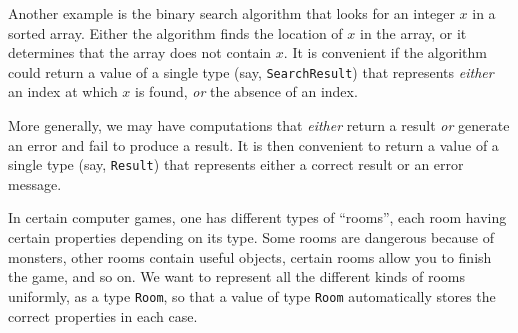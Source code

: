 Another example is the binary search algorithm that looks for an integer
$x$ in a sorted array. Either the algorithm finds the location of
$x$ in the array, or it determines that the array does not contain
$x$. It is convenient if the algorithm could return a value of a
single type (say, \lstinline!SearchResult!) that represents \emph{either}
an index at which $x$ is found, \emph{or} the absence of an index.

More generally, we may have computations that \emph{either} return
a result \emph{or} generate an error and fail to produce a result.
It is then convenient to return a value of a single type (say, \lstinline!Result!)
that represents either a correct result or an error message. 

In certain computer games, one has different types of ``rooms'',
each room having certain properties depending on its type. Some rooms
are dangerous because of monsters, other rooms contain useful objects,
certain rooms allow you to finish the game, and so on. We want to
represent all the different kinds of rooms uniformly, as a type \lstinline!Room!,
so that a value of type \lstinline!Room! automatically stores the
correct properties in each case.

